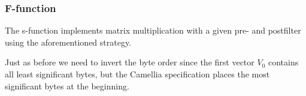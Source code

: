 \subsubsection{F-function}

The s-function implements matrix multiplication with a given pre- and
postfilter using the aforementioned strategy.



Just as before we need to invert the byte order since the first vector $V_0$
contains all least significant bytes, but the Camellia specification places the
most significant bytes at the beginning.


